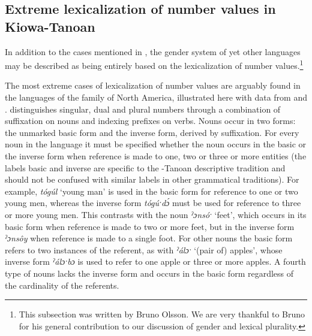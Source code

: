 \documentclass[output=collectionpaper]{langsci/langscibook}
\begin{document}
  \subsection{Extreme lexicalization of number values in Kiowa-Tanoan}
\largerpage[1.5]
In addition to the cases mentioned in , the gender system of yet other languages may be described as being entirely based on the lexicalization of number values.\footnote{%
This subsection was written by Bruno Olsson. We are very thankful to Bruno for his general contribution to our discussion of gender and lexical plurality.}
\clearpage 

The most extreme cases of lexicalization of number values are arguably found in the languages of the  family of North America, illustrated here with  data from \cite[310]{Sutton2014} and \cite[78]{Watkins1984}.  distinguishes singular, dual and plural numbers through a combination of suffixation on nouns and indexing prefixes on verbs. Nouns occur in two forms: the unmarked basic form and the inverse form, derived by suffixation. For every noun in the language it must be specified whether the noun occurs in the basic or the inverse form when reference is made to one, two or three or more entities (the labels basic and inverse are specific to the -Tanoan descriptive tradition and should not be confused with similar labels in other grammatical traditions). For example, \textit{tógúl} `young man' is used in the basic form for reference to one or two young men, whereas the inverse form \textit{tógúˑdɔ́} must be used for reference to three or more young men. This contrasts with the noun \textit{ˀɔnsóˑ} `feet', which occurs in its basic form when reference is made to two or more feet, but in the inverse form \textit{ˀɔnsôy} when reference is made to a single foot. For other nouns the basic form refers to two instances of the referent, as with \textit{ˀálɔˑ} `(pair of) apples', whose inverse form \textit{ˀálɔˑbɔ} is used to refer to one apple or three or more apples. A fourth type of nouns lacks the inverse form and occurs in the basic form regardless of the cardinality of the referents.
\end{document}
